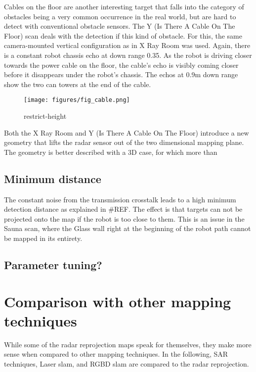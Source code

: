 Cables on the floor are another interesting target that falls into the
category of obstacles being a very common occurrence in the real world,
but are hard to detect with conventional obstacle sensors. The Y (Is
There A Cable On The Floor) scan deals with the detection if this kind
of obstacle. For this, the same camera-mounted vertical configuration as
in X Ray Room was used. Again, there is a constant robot chassis echo at
down range 0.35. As the robot is driving closer towards the power cable
on the floor, the cable's echo is visibly coming closer before it
disappears under the robot's chassis. The echos at 0.9m down range show
the two can towers at the end of the cable.

\begin{figure}
\centering
\texttt{[image: figures/fig\_cable.png]}
\caption{restrict-height}
\end{figure}



Both the X Ray Room and Y (Is There A Cable On The Floor) introduce a
new geometry that lifts the radar sensor out of the two dimensional
mapping plane. The geometry is better described with a 3D case, for
which more than

\subsection{Minimum distance}\label{minimum-distance}

The constant noise from the transmission crosstalk leads to a high
minimum detection distance as explained in \#REF. The effect is that
targets can not be projected onto the map if the robot is too close to
them. This is an issue in the Sauna scan, where the Glass wall right at
the beginning of the robot path cannot be mapped in its entirety.

\subsection{Parameter tuning?}\label{parameter-tuning}

\section{Comparison with other mapping
techniques}\label{comparison-with-other-mapping-techniques}

While some of the radar reprojection maps speak for themselves, they
make more sense when compared to other mapping techniques. In the
following, SAR techniques, Laser slam, and RGBD slam are compared to the
radar reprojection.

